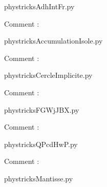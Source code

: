 
    \newcommand{\CaptionFigAdhIntFr}{<+Type your caption here+>}
    \begin{center}
        
    \end{center}
    phystricksAdhIntFr.py

    Comment : 

    \clearpage
    


    \newcommand{\CaptionFigAccumulationIsole}{<+Type your caption here+>}
    \begin{center}
        
    \end{center}
    phystricksAccumulationIsole.py

    Comment : 

    \clearpage
    


    \newcommand{\CaptionFigCercleImplicite}{<+Type your caption here+>}
    \begin{center}
        
    \end{center}
    phystricksCercleImplicite.py

    Comment : 

    \clearpage
    


    \newcommand{\CaptionFigFGWjJBX}{<+Type your caption here+>}
    \begin{center}
        
    \end{center}
    phystricksFGWjJBX.py

    Comment : 

    \clearpage
    


    \newcommand{\CaptionFigQPcdHwP}{<+Type your caption here+>}
    \begin{center}
        
    \end{center}
    phystricksQPcdHwP.py

    Comment : 

    \clearpage
    


    \newcommand{\CaptionFigMantisse}{<+Type your caption here+>}
    \begin{center}
        
    \end{center}
    phystricksMantisse.py

